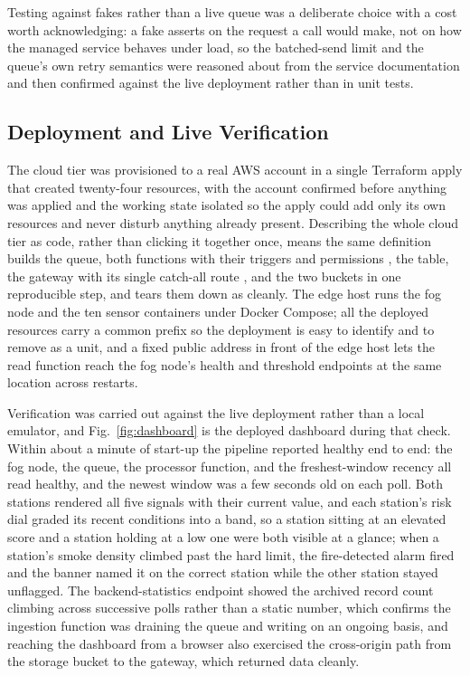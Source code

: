 \documentclass[conference]{IEEEtran}
\begin{document}
Testing against fakes rather than a live queue was a deliberate choice with a cost worth acknowledging: a fake asserts on the request a call would make, not on how the managed service behaves under load, so the batched-send limit and the queue's own retry semantics were reasoned about from the service documentation \cite{awssqs} and then confirmed against the live deployment rather than in unit tests.

\subsection{Deployment and Live Verification}

The cloud tier was provisioned to a real AWS account in a single Terraform apply that created twenty-four resources, with the account confirmed before anything was applied and the working state isolated so the apply could add only its own resources and never disturb anything already present. Describing the whole cloud tier as code, rather than clicking it together once, means the same definition builds the queue, both functions with their triggers and permissions \cite{awslambda}, the table, the gateway with its single catch-all route \cite{awsapigw}, and the two buckets in one reproducible step, and tears them down as cleanly. The edge host runs the fog node and the ten sensor containers under Docker Compose; all the deployed resources carry a common prefix so the deployment is easy to identify and to remove as a unit, and a fixed public address in front of the edge host lets the read function reach the fog node's health and threshold endpoints at the same location across restarts.

Verification was carried out against the live deployment rather than a local emulator, and Fig.~\ref{fig:dashboard} is the deployed dashboard during that check. Within about a minute of start-up the pipeline reported healthy end to end: the fog node, the queue, the processor function, and the freshest-window recency all read healthy, and the newest window was a few seconds old on each poll. Both stations rendered all five signals with their current value, and each station's risk dial graded its recent conditions into a band, so a station sitting at an elevated score and a station holding at a low one were both visible at a glance; when a station's smoke density climbed past the hard limit, the fire-detected alarm fired and the banner named it on the correct station while the other station stayed unflagged. The backend-statistics endpoint showed the archived record count climbing across successive polls rather than a static number, which confirms the ingestion function was draining the queue and writing on an ongoing basis, and reaching the dashboard from a browser also exercised the cross-origin path from the storage bucket to the gateway, which returned data cleanly.
\end{document}
